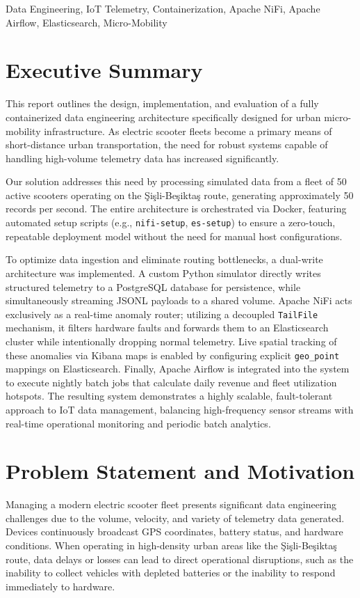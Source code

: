 \documentclass[conference]{IEEEtran}
\begin{document}
\begin{IEEEkeywords}
Data Engineering, IoT Telemetry, Containerization, Apache NiFi, Apache Airflow, Elasticsearch, Micro-Mobility
\end{IEEEkeywords}

\section{Executive Summary}
This report outlines the design, implementation, and evaluation of a fully containerized data engineering architecture specifically designed for urban micro-mobility infrastructure. As electric scooter fleets become a primary means of short-distance urban transportation, the need for robust systems capable of handling high-volume telemetry data has increased significantly.

Our solution addresses this need by processing simulated data from a fleet of 50 active scooters operating on the Şişli-Beşiktaş route, generating approximately 50 records per second. The entire architecture is orchestrated via Docker, featuring automated setup scripts (e.g., \texttt{nifi-setup}, \texttt{es-setup}) to ensure a zero-touch, repeatable deployment model without the need for manual host configurations.

To optimize data ingestion and eliminate routing bottlenecks, a dual-write architecture was implemented. A custom Python simulator directly writes structured telemetry to a PostgreSQL database for persistence, while simultaneously streaming JSONL payloads to a shared volume. Apache NiFi acts exclusively as a real-time anomaly router; utilizing a decoupled \texttt{TailFile} mechanism, it filters hardware faults and forwards them to an Elasticsearch cluster while intentionally dropping normal telemetry. Live spatial tracking of these anomalies via Kibana maps is enabled by configuring explicit \texttt{geo\_point} mappings on Elasticsearch. Finally, Apache Airflow is integrated into the system to execute nightly batch jobs that calculate daily revenue and fleet utilization hotspots. The resulting system demonstrates a highly scalable, fault-tolerant approach to IoT data management, balancing high-frequency sensor streams with real-time operational monitoring and periodic batch analytics.

\section{Problem Statement and Motivation}
Managing a modern electric scooter fleet presents significant data engineering challenges due to the volume, velocity, and variety of telemetry data generated. Devices continuously broadcast GPS coordinates, battery status, and hardware conditions. When operating in high-density urban areas like the Şişli-Beşiktaş route, data delays or losses can lead to direct operational disruptions, such as the inability to collect vehicles with depleted batteries or the inability to respond immediately to hardware.
\end{document}

